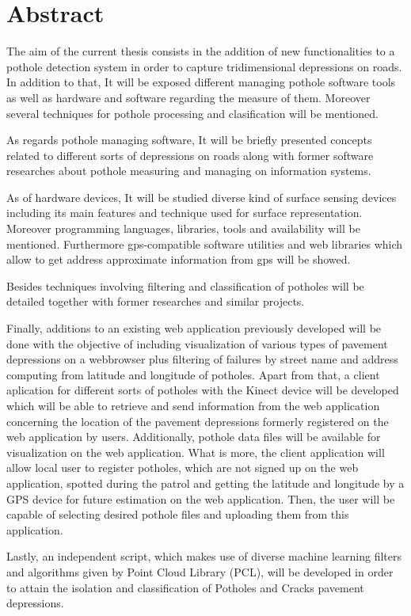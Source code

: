 \chapter{Abstract}

The aim of the current thesis consists in the addition of new functionalities to a pothole detection system in order to capture tridimensional depressions on roads. In addition to that, It will be exposed different managing pothole software tools as well as hardware and software regarding the measure of them. Moreover several techniques for pothole processing and clasification will be mentioned.

As regards pothole managing software, It will be briefly presented concepts related to different sorts of depressions on roads along with former software researches about pothole measuring and managing on information systems.

As of hardware devices, It will be studied diverse kind of surface sensing devices including its main features and technique used for surface representation. Moreover programming languages, libraries, tools and availability will be mentioned. Furthermore gps-compatible software utilities and web libraries which allow to get address approximate information from gps will be showed.

Besides techniques involving filtering and classification of potholes will be detailed together with former researches and similar projects.

Finally, additions to an existing web application previously developed will be done with the objective of including visualization of various types of pavement depressions on a webbrowser plus filtering of failures by street name and address computing from latitude and longitude of potholes. Apart from that, a client aplication for different sorts of potholes with the Kinect device will be developed which will be able to retrieve and send information from the web application concerning the location of the pavement depressions formerly registered on the web application by users. Additionally, pothole data files will be available for visualization on the web application.
What is more, the client application will allow local user to register potholes, which are not signed up on the web application, spotted during the patrol and getting the latitude and longitude by a GPS device for future estimation on the web application. Then, the user will be capable of selecting desired pothole files and uploading them from this application.

Lastly, an independent script, which makes use of diverse machine learning filters and algorithms given by Point Cloud Library (PCL), will be developed in order to attain the isolation and classification of Potholes and Cracks pavement depressions. 





